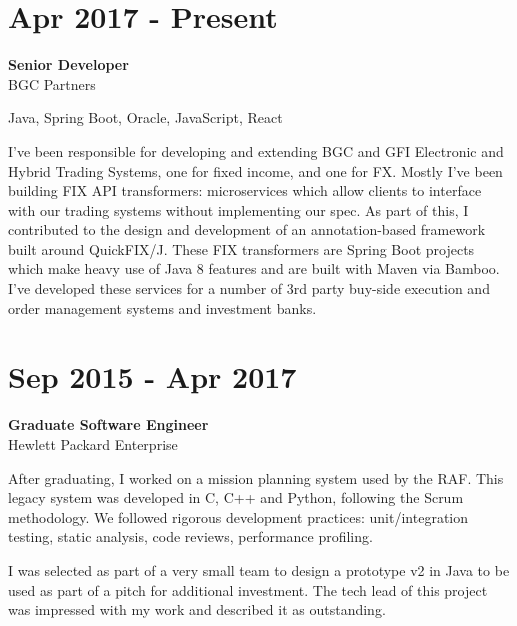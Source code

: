 \documentclass{article}
\begin{document}
\begin{minipage}[t]{0.35\linewidth}
\section*{Apr 2017 - Present}
\textbf{Senior Developer}\\
BGC Partners

\vspace{0.3cm}Java, Spring Boot, Oracle, JavaScript, React

\vspace{0.3cm}I’ve been responsible for developing and extending BGC and GFI Electronic and Hybrid Trading Systems, one for fixed income, and one for FX. Mostly I’ve been building FIX API transformers: microservices which allow clients to interface with our trading systems without implementing our spec. As part of this, I contributed to the design and development of an annotation-based framework built around QuickFIX/J. These FIX transformers are Spring Boot projects which make heavy use of Java 8 features and are built with Maven via Bamboo. I’ve developed these services for a number of 3rd party buy-side execution and order management systems and investment banks.

\section*{Sep 2015 - Apr 2017}
\textbf{Graduate Software Engineer}\\
Hewlett Packard Enterprise

\vspace{0.3cm}After graduating, I worked on a mission planning system used by the RAF. This legacy system was developed in C, C++ and Python, following the Scrum methodology. We followed rigorous development practices: unit/integration testing, static analysis, code reviews, performance profiling.

\vspace{0.3cm}I was selected as part of a very small team to design a prototype v2 in Java to be used as part of a pitch for additional investment. The tech lead of this project was impressed with my work and described it as outstanding.
\end{minipage}
\hspace{0.5cm}
\end{document}
